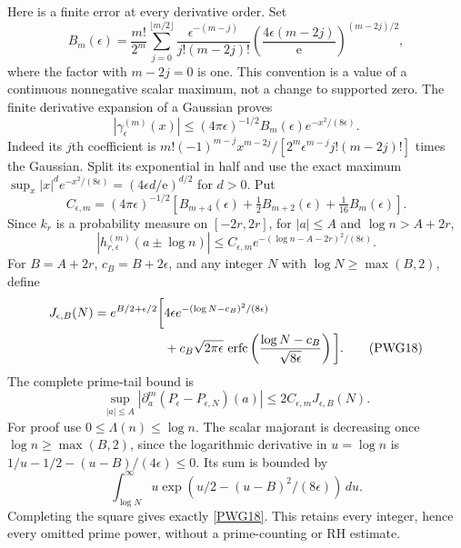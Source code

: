 Here is a finite error at every derivative order. Set
\begin{equation}
 B_m(\epsilon)=\frac{m!}{2^m}
 \sum_{j=0}^{\lfloor m/2\rfloor}
 \frac{\epsilon^{-(m-j)}}{j!(m-2j)!}
 \left(\frac{4\epsilon(m-2j)}{\mathrm e}\right)^{(m-2j)/2},
                                                               \tag{PWG15}\label{PWG15}
\end{equation}
where the factor with $m-2j=0$ is one. This convention is a value of a continuous nonnegative scalar maximum, not a change to supported zero. The finite derivative expansion of a Gaussian proves
\begin{equation}
 |\gamma_\epsilon^{(m)}(x)|\le
 (4\pi\epsilon)^{-1/2}B_m(\epsilon)e^{-x^2/(8\epsilon)}.
                                                               \tag{PWG16}\label{PWG16}
\end{equation}
Indeed its $j$th coefficient is
$m!(-1)^{m-j}x^{m-2j}/[2^m\epsilon^{m-j}j!(m-2j)!]$ times the Gaussian. Split its exponential in half and use the exact maximum
$\sup_x|x|^d e^{-x^2/(8\epsilon)}=(4\epsilon d/\mathrm e)^{d/2}$ for $d>0$.
Put
\begin{equation}
 C_{\epsilon,m}=(4\pi\epsilon)^{-1/2}
 \left[B_{m+4}(\epsilon)+\tfrac12B_{m+2}(\epsilon)
                                      +\tfrac1{16}B_m(\epsilon)\right].
                                                               \tag{PWG17}\label{PWG17}
\end{equation}
Since $k_r$ is a probability measure on $[-2r,2r]$, for $|a|\le A$ and $\log n>A+2r$,
\[
 |h_{r,\epsilon}^{(m)}(a\pm\log n)|
 \le C_{\epsilon,m}
        e^{-(\log n-A-2r)^2/(8\epsilon)}.
\]
For $B=A+2r$, $c_B=B+2\epsilon$, and any integer $N$ with
$\log N\ge\max(B,2)$, define
\begin{align}
 J_{\epsilon,B}(N)=e^{B/2+\epsilon/2}
 \bigg[&4\epsilon e^{-(\log N-c_B)^2/(8\epsilon)}\notag\\
 &+c_B\sqrt{2\pi\epsilon}\,
  \operatorname{erfc}\left(\frac{\log N-c_B}{\sqrt{8\epsilon}}\right)\bigg].
                                                               \tag{PWG18}\label{PWG18}
\end{align}
The complete prime-tail bound is
\begin{equation}
 \boxed{\sup_{|a|\le A}|\partial_a^m(P_\epsilon-P_{\epsilon,N})(a)|
       \le2C_{\epsilon,m}J_{\epsilon,B}(N).}                 \tag{PWG19}\label{PWG19}
\end{equation}
For proof use $0\le\Lambda(n)\le\log n$. The scalar majorant is decreasing once $\log n\ge\max(B,2)$, since the logarithmic derivative in $u=\log n$ is
$1/u-1/2-(u-B)/(4\epsilon)\le0$. Its sum is bounded by
\[
 \int_{\log N}^\infty u\exp\left(u/2-(u-B)^2/(8\epsilon)\right)\,du.
\]
Completing the square gives exactly \eqref{PWG18}. This retains every integer, hence every omitted prime power, without a prime-counting or RH estimate.

